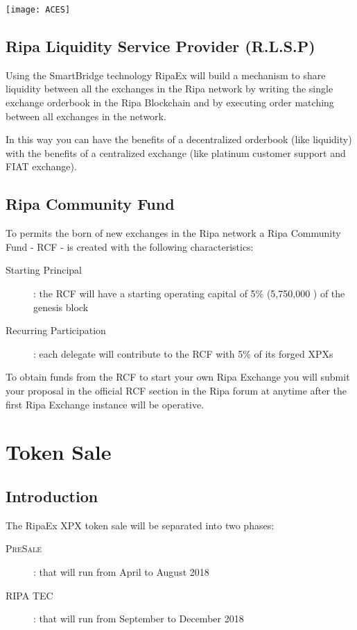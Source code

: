 \documentclass[11pt,fleqn,oneside]{book} %
\begin{document}
\begin{center}
	\texttt{[image: ACES]}
\end{center}

\section{Ripa Liquidity Service Provider (R.L.S.P)}
Using the SmartBridge technology RipaEx will build a mechanism to share liquidity between all the exchanges in the Ripa network
by writing the single exchange orderbook in the Ripa Blockchain and by executing order matching between all exchanges in the network.

In this way you can have the benefits of a decentralized orderbook (like liquidity) with the benefits of a centralized exchange (like
platinum customer support and FIAT exchange).

\section{Ripa Community Fund}
To permits the born of new exchanges in the Ripa network a Ripa Community Fund - RCF - is created with the following characteristics:
\begin{description}
	\item[Starting Principal]: the RCF will have a starting operating capital of 5\% (5,750,000 \PHP) of the genesis block
	\item[Recurring Participation]: each delegate will contribute to the RCF with 5\% of its forged XPXs
\end{description}

To obtain funds from the RCF to start your own Ripa Exchange you will submit your proposal in the official RCF section in the Ripa forum at
anytime after the first Ripa Exchange instance will be operative.


\chapter{Token Sale}
\section{Introduction}
The RipaEx XPX token sale will be separated into two phases:
	\begin{description}
		\item[\textsc{PreSale}]: that will run from April to August 2018
		\item[\textsc{RIPA TEC}]: that will run from September to December 2018
	\end{description}
\end{document}
